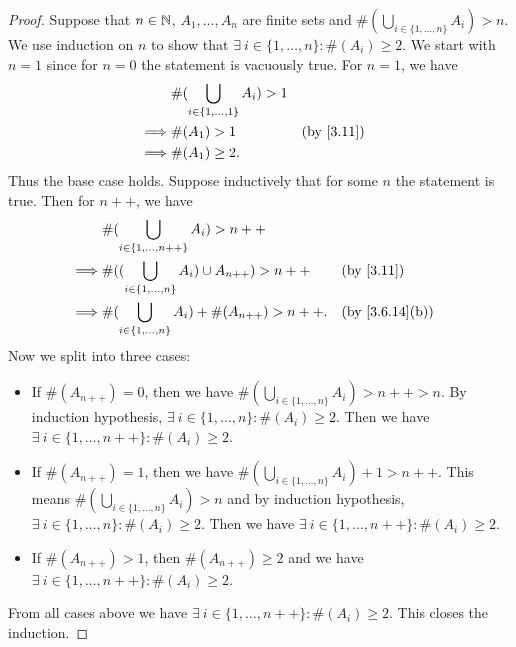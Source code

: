 \begin{proof}
  Suppose that \(n \in \mathbb{N}\), \(A_1, \dots, A_n\) are finite sets and \(\#(\bigcup_{i \in \{1, \dots, n\}} A_i) > n\).
  We use induction on \(n\) to show that \(\exists\ i \in \{1, \dots, n\} : \#(A_i) \geq 2\).
  We start with \(n = 1\) since for \(n = 0\) the statement is vacuously true.
  For \(n = 1\), we have
  \begin{align*}
             & \#(\bigcup_{i \in \{1, \dots, 1\}} A_i) > 1                              \\
    \implies & \#(A_1) > 1                                 &  & \text{(by \cref{3.11})} \\
    \implies & \#(A_1) \geq 2.
  \end{align*}
  Thus the base case holds.
  Suppose inductively that for some \(n\) the statement is true.
  Then for \(n++\), we have
  \begin{align*}
             & \#(\bigcup_{i \in \{1, \dots, n++\}} A_i) > n++                                                \\
    \implies & \#((\bigcup_{i \in \{1, \dots, n\}} A_i) \cup A_{n++}) > n++ &  & \text{(by \cref{3.11})}      \\
    \implies & \#(\bigcup_{i \in \{1, \dots, n\}} A_i) + \#(A_{n++}) > n++. &  & \text{(by \cref{3.6.14}(b))}
  \end{align*}
  Now we split into three cases:
  \begin{itemize}
    \item If \(\#(A_{n++}) = 0\), then we have \(\#(\bigcup_{i \in \{1, \dots, n\}} A_i) > n++ > n\).
          By induction hypothesis, \(\exists\ i \in \{1, \dots, n\} : \#(A_i) \geq 2\).
          Then we have \(\exists\ i \in \{1, \dots, n++\} : \#(A_i) \geq 2\).
    \item If \(\#(A_{n++}) = 1\), then we have \(\#(\bigcup_{i \in \{1, \dots, n\}} A_i) + 1 > n++\).
          This means \(\#(\bigcup_{i \in \{1, \dots, n\}} A_i) > n\) and by induction hypothesis, \(\exists\ i \in \{1, \dots, n\} : \#(A_i) \geq 2\).
          Then we have \(\exists\ i \in \{1, \dots, n++\} : \#(A_i) \geq 2\).
    \item If \(\#(A_{n++}) > 1\), then \(\#(A_{n++}) \geq 2\) and we have \(\exists\ i \in \{1, \dots, n++\} : \#(A_i) \geq 2\).
  \end{itemize}
  From all cases above we have \(\exists\ i \in \{1, \dots, n++\} : \#(A_i) \geq 2\).
  This closes the induction.
\end{proof}
